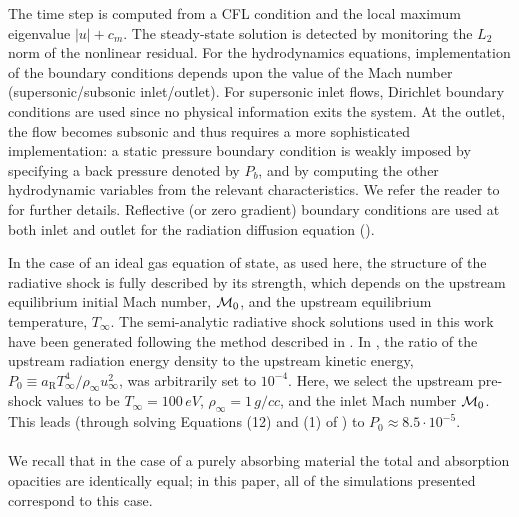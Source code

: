 \documentclass[times,doublespace]{fldauth}%
\begin{document}
The time step is computed from a CFL condition and the local maximum eigenvalue $|u|+c_m$.
The steady-state solution is detected by monitoring the $L_2$ norm of the nonlinear residual. 
For the hydrodynamics equations, implementation of the boundary conditions depends upon the value of the Mach number (supersonic/subsonic inlet/outlet).
For supersonic inlet flows, Dirichlet boundary conditions are used since no physical information exits the system.
At the outlet, the flow becomes subsonic and thus requires a more sophisticated implementation: a static pressure boundary condition is weakly imposed by specifying a back pressure denoted by $P_b$, and by computing the other hydrodynamic variables from the relevant characteristics. We refer the reader to  for further details.
Reflective (or zero gradient) boundary conditions are used at both inlet and outlet for the radiation diffusion equation ().

In the case of an ideal gas equation of state, as used here, the structure of the radiative shock is fully described by its strength, which depends on the upstream equilibrium initial Mach number, ${\cal M}_0$, and the upstream equilibrium temperature, $T_{\infty}$.
The semi-analytic radiative shock solutions used in this work have been generated following the method described in \cite{LowrieRauenzahn,LowrieEdwards}.
In \cite{LowrieEdwards}, the ratio of the upstream radiation energy density to the upstream kinetic energy, $P_0 \equiv a_{\textrm{R}} T_{\infty}^4 / \rho_{\infty} u_{\infty}^2$, was arbitrarily set to $10^{-4}$. Here, we select the upstream pre-shock values to be $T_{\infty} = 100\, eV$, $\rho_{\infty} = 1\, g/cc$, and the inlet Mach number ${\cal M}_0$. This leads
(through solving Equations (12) and (1) of \cite{LowrieRauenzahn}) to $P_0 \approx 8.5 \cdot 10^{-5}$.  
\\
   \\
We recall that in the case of a purely absorbing material the total and absorption opacities are identically equal; in this paper, all of the simulations presented correspond to this case. 
\end{document}
